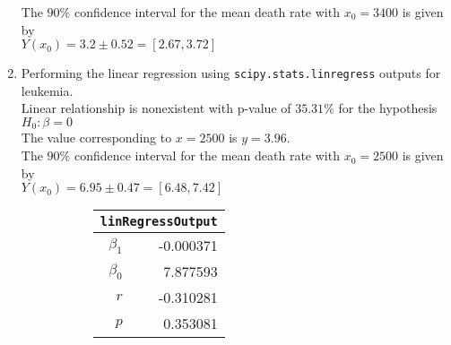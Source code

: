 \begin{enumerate}
The $ 90\% $ confidence interval for the mean death rate with $ x_0 = 3400 $ is given by \\
$ Y(x_0) = 3.2 \pm 0.52 = [2.67, 3.72] $\\


\item Performing the linear regression using \texttt{scipy.stats.linregress} outputs for leukemia. \\
Linear relationship is nonexistent with p-value of $ 35.31\% $ for the hypothesis $ H_0 : \beta = 0 $\\
The value corresponding to $ x = 2500 $ is $ y = 3.96 $.\\
The $ 90\% $ confidence interval for the mean death rate with $ x_0 = 2500 $ is given by \\
$ Y(x_0) = 6.95 \pm 0.47 = [6.48, 7.42] $\\

\begin{figure}[H]
	\begin{subfigure}[]{0.2\linewidth}
		\centering
		\begin{tabular}{@{}rr@{}}
			\toprule
			\multicolumn{2}{c}{\texttt{linRegressOutput}} \\
			\midrule
			$\beta_1$     &        -0.000371 \\
			$\beta_0$ &         7.877593 \\
			$r$    &        -0.310281 \\
			$p$    &         0.353081 \\
			\bottomrule
		\end{tabular}
		
	\end{subfigure}
	\begin{subfigure}[]{0.8\linewidth}
		\centering
		
	\end{subfigure}
\end{figure}


\end{enumerate}
